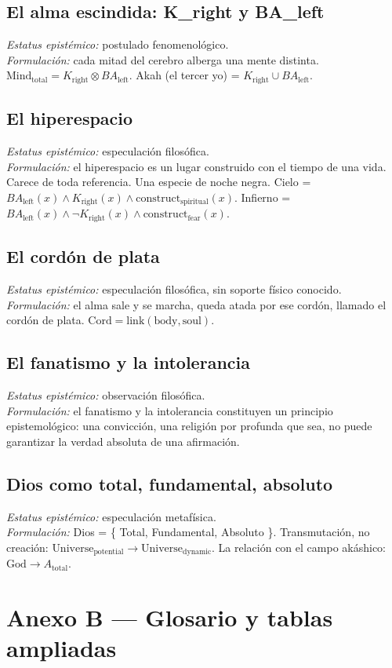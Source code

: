 \subsection{El alma escindida: K\_right y BA\_left}
\textit{Estatus epistémico:} postulado fenomenológico. \\
\textit{Formulación:} cada mitad del cerebro alberga una mente distinta. $\text{Mind}_{\text{total}} = K_{\text{right}} \otimes BA_{\text{left}}$. Akah (el tercer yo) = $K_{\text{right}} \cup BA_{\text{left}}$.

\subsection{El hiperespacio}
\textit{Estatus epistémico:} especulación filosófica. \\
\textit{Formulación:} el hiperespacio es un lugar construido con el tiempo de una vida. Carece de toda referencia. Una especie de noche negra. Cielo = $BA_{\text{left}}(x) \land K_{\text{right}}(x) \land \text{construct}_{\text{spiritual}}(x)$. Infierno = $BA_{\text{left}}(x) \land \neg K_{\text{right}}(x) \land \text{construct}_{\text{fear}}(x)$.

\subsection{El cordón de plata}
\textit{Estatus epistémico:} especulación filosófica, sin soporte físico conocido. \\
\textit{Formulación:} el alma sale y se marcha, queda atada por ese cordón, llamado el cordón de plata. $\text{Cord} = \text{link}(\text{body}, \text{soul})$.

\subsection{El fanatismo y la intolerancia}
\textit{Estatus epistémico:} observación filosófica. \\
\textit{Formulación:} el fanatismo y la intolerancia constituyen un principio epistemológico: una convicción, una religión por profunda que sea, no puede garantizar la verdad absoluta de una afirmación.

\subsection{Dios como total, fundamental, absoluto}
\textit{Estatus epistémico:} especulación metafísica. \\
\textit{Formulación:} Dios = \{ Total, Fundamental, Absoluto \}. Transmutación, no creación: $\text{Universe}_{\text{potential}} \to \text{Universe}_{\text{dynamic}}$. La relación con el campo akáshico: $\text{God} \to A_{\text{total}}$.

\section{Anexo B --- Glosario y tablas ampliadas}
